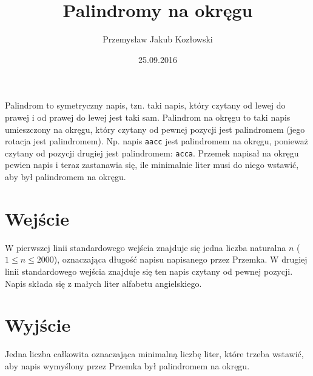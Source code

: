 \documentclass[zad,zawodnik,utf8]{sinol}
\title{Palindromy na okręgu}
\author{Przemysław Jakub Kozłowski} %
\date{25.09.2016}
\begin{document}
\begin{tasktext}%
Palindrom to symetryczny napis, tzn. taki napis, który czytany od lewej do prawej i od prawej do lewej
jest taki sam.
Palindrom na okręgu to taki napis umieszczony na okręgu, który czytany od pewnej pozycji jest palindromem (jego rotacja jest palindromem). 
Np. napis \texttt{aacc} jest palindromem na okręgu, ponieważ czytany od pozycji drugiej jest palindromem: \texttt{acca}. 
Przemek napisał na okręgu pewien napis i teraz zastanawia się, ile minimalnie liter musi do niego wstawić, aby był palindromem na okręgu.

  \section{Wejście}
W pierwszej linii standardowego wejścia znajduje się jedna liczba naturalna $n$ ($1 \leq n \leq 2000$), oznaczająca długość napisu napisanego przez Przemka.
W drugiej linii standardowego wejścia znajduje się ten napis czytany od pewnej pozycji. Napis składa się z małych liter alfabetu angielskiego.

  \section{Wyjście}
Jedna liczba całkowita oznaczająca minimalną liczbę liter, które trzeba wstawić, aby napis wymyślony przez Przemka był palindromem na okręgu.

\makecompactexample

\end{tasktext}
\end{document}
